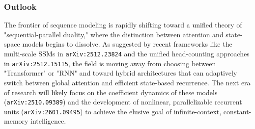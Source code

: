 \documentclass[11pt]{article}
\begin{document}
\subsubsection{Outlook}

The frontier of sequence modeling is rapidly shifting toward a unified theory of "sequential-parallel duality," where the distinction between attention and state-space models begins to dissolve. As suggested by recent frameworks like the multi-scale SSMs in \texttt{arXiv:2512.23824} and the unified head-counting approaches in \texttt{arXiv:2512.15115}, the field is moving away from choosing between "Transformer" or "RNN" and toward hybrid architectures that can adaptively switch between global attention and efficient state-based recurrence. The next era of research will likely focus on the coefficient dynamics of these models (\texttt{arXiv:2510.09389}) and the development of nonlinear, parallelizable recurrent units (\texttt{arXiv:2601.09495}) to achieve the elusive goal of infinite-context, constant-memory intelligence.
\end{document}
